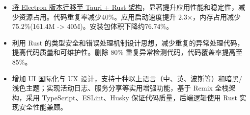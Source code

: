 \documentclass{resume}
\newcommand{\en}[1]{}
\newcommand{\zh}[1]{#1}
\begin{document}
\en{\datedsubsection{\textbf{\href{https://github.com/shaonhuang/V2rayX}{V2rayX (Rust/Tauri 2 Refactor)}}}{}}
\zh{}
\begin{itemize}
    \item \en{\href{\detokenize{https://shaonhuang.vercel.app/posts/v2rayx-refactor}}{Led the migration of V2rayX from Electron to a modern Rust + Tauri architecture}, achieving substantial gains in performance, stability, and resource efficiency. Reduced code duplication by 40\%, improved startup speed by 2.3x, decreased memory usage by 75.2\% (161.4MB→40MB), and minimized installer size by 76.74\%.}
          \zh{\href{\detokenize{https://shaonhuang.vercel.app/posts/v2rayx-refactor}}{将 Electron 版本迁移至 Tauri + Rust 架构}，显著提升应用性能和稳定性，减少资源占用。代码重复率减少40\%。应用启动速度提升 2.3×，内存占用减少 75.2\%(161.4M -> 40M)。安装包体积下降约76.74\%。}
    \item \en{Applied advanced Rust paradigms for type safety and error handling, eliminating 80\% of redundant exception logic and increasing code coverage to 85\%, resulting in a highly robust and maintainable codebase.}
          \zh{利用 Rust 的类型安全和错误处理机制设计思想，减少重复的异常处理代码，提高代码质量和可维护性。删除 80\% 重复异常检测代码，代码覆盖率提高至 85\%。}
    \item \en{Implemented comprehensive UI internationalization (supporting over 10 languages, including Chinese, English, Persian, etc.) and major UX enhancements, such as dark/light themes, activity logging, and service sharing. Built on a full-stack Remix architecture with TypeScript, ESLint, and Husky for code quality, and Rust for secure and high-performance backend logic.}
          \zh{增加 UI 国际化与 UX 设计，支持十种以上语言（中、英、波斯等）和暗黑/浅色主题；实现活动日志、服务分享等实用增强功能，基于 Remix 全栈架构，采用 TypeScript、ESLint、Husky 保证代码质量，后端逻辑使用 Rust 实现安全性能兼顾。}
\end{itemize}
\end{document}
